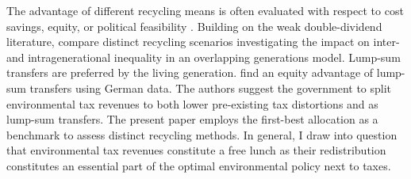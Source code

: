 The advantage of different recycling means is often evaluated with respect to cost savings, equity, or political feasibility \citep{Carattini2018, Goulder2019IncomeGroups, VANDERPLOEG2022103966, Kotlikoff2019NBERWin, Carbone2013DeficitImpacts}. Building on the weak double-dividend literature, \cite{Fried2018TheGenerations} compare distinct recycling scenarios investigating the impact on inter- and intragenerational inequality in an overlapping generations model. Lump-sum transfers are preferred by the  living generation. 
 \cite{VANDERPLOEG2022103966} find an equity advantage of lump-sum transfers using German data. The authors suggest the government to split environmental tax revenues to both lower pre-existing tax distortions and as lump-sum transfers. The present paper employs the first-best allocation as a benchmark to assess distinct recycling methods.
In general, I draw into question that environmental tax revenues constitute a free lunch as their redistribution constitutes an essential part of the optimal environmental policy next to taxes.


